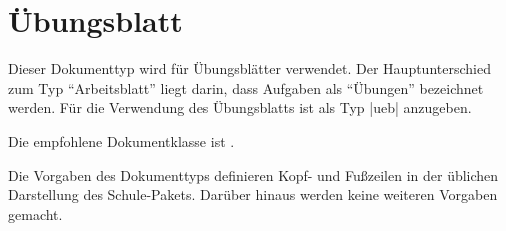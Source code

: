 \section{Übungsblatt}
\label{typ:ueb}
Dieser Dokumenttyp wird für Übungsblätter verwendet. Der Hauptunterschied zum Typ \enquote{Arbeitsblatt} liegt darin, dass Aufgaben als \enquote{Übungen} bezeichnet werden. Für die Verwendung des Übungsblatts ist als Typ \verbcode|ueb| anzugeben.

Die empfohlene Dokumentklasse ist .

Die Vorgaben des Dokumenttyps definieren Kopf- und Fußzeilen in der üblichen Darstellung des Schule-Pakets. Darüber hinaus werden keine weiteren Vorgaben gemacht.


%
%
